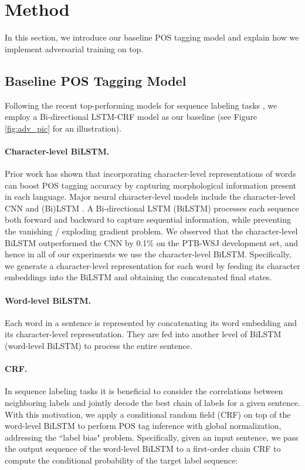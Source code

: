 \documentclass[11pt,a4paper]{article}
\begin{document}
\section{Method}
In this section, we introduce our baseline POS tagging model and explain how we implement adversarial training on top.


\subsection{Baseline POS Tagging Model}
Following the recent top-performing models for sequence labeling tasks \cite{plank2016multilingual,Lample2016ner,ma-hovy:2016:P16-1},
we employ a Bi-directional LSTM-CRF model as our baseline (see Figure \ref{fig:adv_pic} for an illustration).


\paragraph{Character-level BiLSTM.}
Prior work has shown that incorporating character-level representations of words can boost POS tagging accuracy by capturing morphological information present in each language.
Major neural character-level models 
include the character-level CNN \cite{ma-hovy:2016:P16-1} and (Bi)LSTM \cite{dozat-qi-manning:2017:K17-3}.
A Bi-directional LSTM (BiLSTM) \cite{Hochreiter:1997:LSM:1246443.1246450,Schuster:1997:BRN:2198065.2205129} processes each sequence both forward and backward to capture sequential information,
while preventing the vanishing \!/\! exploding gradient problem.
We observed that the character-level BiLSTM outperformed the CNN by 0.1\% on the PTB-WSJ development set, and hence in all of our experiments
we use the character-level BiLSTM.
Specifically, we generate a character-level representation for each word
by feeding its character embeddings into the BiLSTM and obtaining the 
concatenated final states.

\paragraph{Word-level BiLSTM.}

Each word in a sentence is represented by concatenating its word embedding and its character-level representation.
They are fed into another level of BiLSTM (word-level BiLSTM) to process the entire sentence.



\paragraph{CRF.}
In sequence labeling tasks it is beneficial to consider the correlations between neighboring labels and jointly decode the best chain of labels for a given sentence.
With this motivation, we apply a conditional random field (CRF) \cite{lafferty:2001} on top of the word-level BiLSTM to perform POS tag inference with global normalization, addressing the ``label bias" problem.
Specifically, given an input sentence, we pass the output sequence of the word-level BiLSTM to a first-order chain CRF to compute the conditional probability of the target label sequence: 
\end{document}
